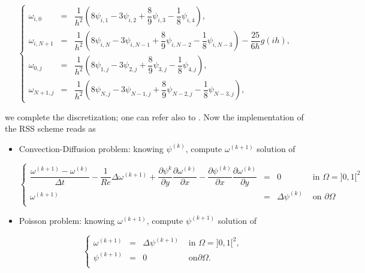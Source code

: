 \documentclass[11pt]{article}
\begin{document}
{\begin{center}
\begin{equation}\label{NS_extrap4}
\left\lbrace  \begin{array}{rcl}
\omega_{i,0} & = & \dfrac{1}{h^2} \left( 8 \psi_{i,1} - 3 \psi_{i,2} + \dfrac{8}{9} \psi_{i,3} - \dfrac{1}{8} \psi_{i,4} \right),\\
\omega_{i,N+1} & = & \dfrac{1}{h^2} \left( 8 \psi_{i,N} - 3 \psi_{i,N-1} + \dfrac{8}{9} \psi_{i,N-2} - \dfrac{1}{8} \psi_{i,N-3} \right) - \dfrac{25}{6h} g(ih), \\
\omega_{0,j} & = & \dfrac{1}{h^2} \left( 8 \psi_{1,j} - 3 \psi_{2,j} + \dfrac{8}{9} \psi_{3,j} - \dfrac{1}{8} \psi_{4, j} \right),\\
\omega_{N+1, j} & = & \dfrac{1}{h^2} \left( 8 \psi_{N,j} - 3 \psi_{N-1,j} + \dfrac{8}{9} \psi_{N-2,j} - \dfrac{1}{8} \psi_{N-3,j} \right),
\end{array}  \right. 
\end{equation}
\end{center}
we complete the discretization; one can refer also to \cite{ChengWang,LiTangFornberg}. Now the implementation of the RSS scheme reads as

\begin{itemize}
\item Convection-Diffusion problem: knowing $\psi^{(k)}$, compute $\omega^{(k+1)}$ solution of
\begin{center}
\begin{equation}
\left\lbrace  \begin{array}{rcll}
\dfrac{\omega^{(k+1)}-\omega^{(k)}}{\Delta t}-\dfrac{1}{Re} \Delta \omega^{(k+1)} + \dfrac{\partial \psi^k}{\partial y} \dfrac{\partial \omega^{(k)}}{\partial x}  -  \dfrac{\partial \psi^{(k)}}{\partial x} \dfrac{\partial \omega^{(k)}}{\partial y}& = & 0 & \text{ in } \Omega = ]0, 1[^2 \\
\omega^{(k+1)} & = & \Delta \psi^{(k)} & \text{ on } \partial \Omega \\
\end{array}  \right. 
\label{CD_NS}
\end{equation}
\end{center}
\item  Poisson problem: knowing $\omega^{(k+1)}$, compute $\psi^{(k+1)}$ solution of
\begin{center}
\begin{equation}
\left\lbrace  \begin{array}{rcll}
\omega^{(k+1)} & = & \Delta \psi^{(k+1)} & \text{ in } \Omega = ]0, 1[^2, \\
\psi^{(k+1)} & = & 0 & \text{ on} \partial \Omega .\\
\end{array}  \right. 
\label{Poisson_NS}
\end{equation}
\end{center}
\end{itemize}


}
\end{document}
